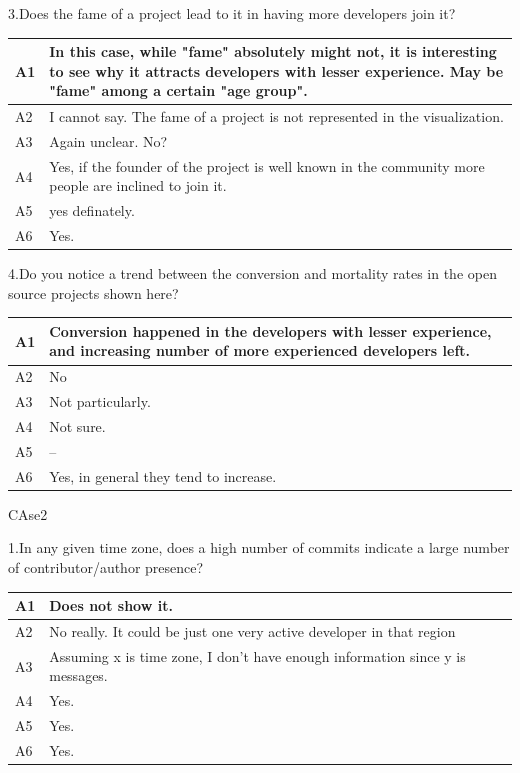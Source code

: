 \documentclass[double,12pt]{beavtex}
\begin{document}
3.Does the fame of a project lead to it in having more developers join it?	


\begin{tabular}{ |p{2cm}|p{12cm}| }
 \hline
 A1 & In this case, while "fame" absolutely might not, it is interesting to see why it attracts developers with lesser experience. May be "fame" among a certain "age group".\\
 \hline
 A2 & I cannot say. The fame of a project is not represented in the visualization.\\ \hline
 A3 & Again unclear. No?\\ \hline
 A4 & Yes, if the founder of the project is well known in the community more people are inclined to join it.\\ \hline
 A5 & yes definately.\\ \hline
 A6 & Yes.\\
 \hline
\end{tabular}


4.Do you notice a trend between the conversion and mortality rates in the open source projects shown here?


\begin{tabular}{ |p{2cm}|p{12cm}| }
 \hline
 A1 & Conversion happened in the developers with lesser experience, and increasing number of more experienced developers left.\\
 \hline
 A2 & No\\ \hline
 A3 & Not particularly.\\ \hline
 A4 & Not sure.\\ \hline
 A5 & --\\ \hline
 A6 & Yes, in general they tend to increase.\\
 \hline
\end{tabular}


CAse2


1.In any given time zone, does a high number of commits indicate a large number of contributor/author presence?	


\begin{tabular}{ |p{2cm}|p{12cm}| }
 \hline
 A1 & Does not show it.\\
 \hline
 A2 & No really. It could be just one very active developer in that region\\ \hline
 A3 & Assuming x is time zone, I don't have enough information since y is messages.\\ \hline
 A4 & Yes.\\ \hline
 A5 & Yes.\\ \hline
 A6 & Yes.\\
 \hline
\end{tabular}
\end{document}
